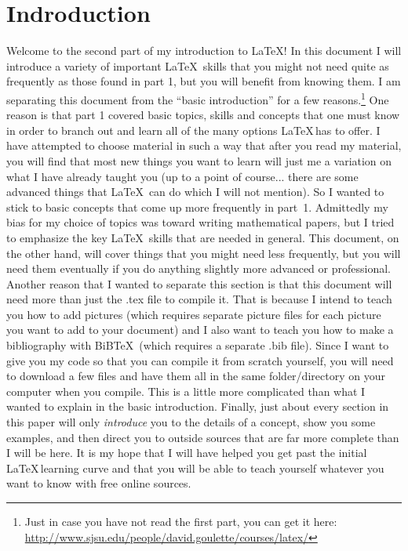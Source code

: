 \documentclass{article}
\begin{document}
\section{Indroduction}
Welcome to the second part of my introduction to \LaTeX!  In this document I will introduce a variety of important \LaTeX\ skills that you might not need quite as frequently as those found in part 1, but you will benefit from knowing them. I am separating this document from the ``basic introduction'' for a few reasons.\footnote{Just in case you have not read the first part, you can get it here: \\\url{http://www.sjsu.edu/people/david.goulette/courses/latex/}}  One reason is that part 1 covered basic topics, skills and concepts that one must know in order to branch out and learn all of the many options \LaTeX\,has to offer.  I have attempted to choose material in such a way that after you read my material, you will find that most new things you want to learn will just me a variation on what I have already taught you (up to a point of course... there are some advanced things that \LaTeX\ can do which I will not mention).  So I wanted to stick to basic concepts that come up more frequently in part~1.  Admittedly my bias for my choice of topics was toward writing mathematical papers, but I tried to emphasize the key \LaTeX\ skills that are needed in general. This document, on the other hand, will cover things that you might need less frequently, but you will need them eventually if you do anything slightly more advanced or professional.  Another reason that I wanted to separate this section is that this document will need more than just the .tex file to compile it.  That is because I intend to teach you how to add pictures (which requires separate picture files for each picture you want to add to your document) and I also want to teach you how to make a bibliography with BiB\TeX\ (which requires a separate .bib file).  Since I want to give you my code so that you can compile it from scratch yourself, you will need to download a few files and have them all in the same folder/directory on your computer when you compile.  This is a little more complicated than what I wanted to explain in the basic introduction.  Finally, just about every section in this paper will only \emph{introduce} you to the details of a concept, show you some examples, and then direct you to outside sources that are far more complete than I will be here. It is my hope that I will have helped you get past the initial \LaTeX\,learning curve and that you will be able to teach yourself whatever you want to know with free online sources.
\end{document}
